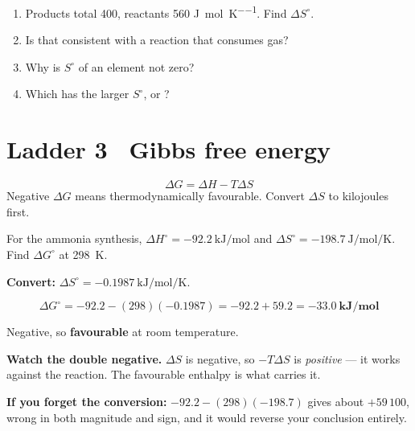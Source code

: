 \documentclass{apchem-worksheet}
\begin{document}
\begin{yourturn}
\begin{enumerate}[leftmargin=*,itemsep=0.5em]
  \item Products total \num{400}, reactants \num{560}
        \si{\joule\per\mole\per\kelvin}. Find $\Delta S^\circ$.
        \workspace[1.4cm]
  \item Is that consistent with a reaction that consumes gas?
        \workspace[1.6cm]
  \item Why is $S^\circ$ of an element not zero? \workspace[1.6cm]
  \item Which has the larger $S^\circ$,  or ?
        \workspace[1.4cm]
\end{enumerate}
\end{yourturn}

\section*{\sffamily Ladder 3 \textbullet\ Gibbs free energy}

\[ \Delta G = \Delta H - T\Delta S \]
Negative $\Delta G$ means thermodynamically favourable. Convert
$\Delta S$ to kilojoules first.

\begin{workedexample}
For the ammonia synthesis,
$\Delta H^\circ = \SI{-92.2}{\kilo\joule\per\mole}$ and
$\Delta S^\circ = \SI{-198.7}{\joule\per\mole\per\kelvin}$. Find
$\Delta G^\circ$ at \SI{298}{\kelvin}.

\textbf{Convert:} $\Delta S^\circ =
\SI{-0.1987}{\kilo\joule\per\mole\per\kelvin}$.

\[ \Delta G^\circ = -92.2 - (298)(-0.1987) = -92.2 + 59.2
   = \mathbf{-33.0~kJ/mol} \]

Negative, so \textbf{favourable} at room temperature.

\textbf{Watch the double negative.} $\Delta S$ is negative, so
$-T\Delta S$ is \emph{positive} --- it works against the reaction. The
favourable enthalpy is what carries it.

\textbf{If you forget the conversion:} $-92.2 - (298)(-198.7)$ gives about
$+59\,100$, wrong in both magnitude and sign, and it would reverse your
conclusion entirely.
\end{workedexample}
\end{document}
